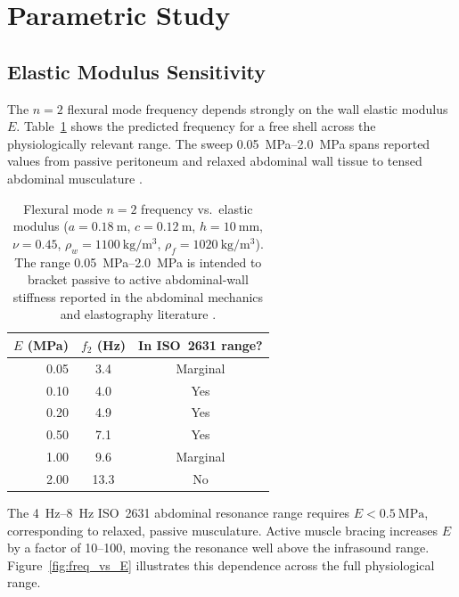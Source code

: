 \section{Parametric Study}\label{sec:results}

\subsection{Elastic Modulus Sensitivity}

The $n=2$ flexural mode frequency depends strongly on the wall elastic
modulus $E$.  Table~\ref{tab:E_sweep} shows the predicted frequency for
a free shell across the physiologically relevant range.  The sweep
\SIrange{0.05}{2.0}{\mega\pascal} spans reported values from passive
peritoneum and relaxed abdominal wall tissue to tensed abdominal musculature
\cite{Deeken2017,Spadoni2024,Sack2023,parker2011imaging}.

\begin{table}[htbp]
  \centering
  \caption{Flexural mode $n=2$ frequency vs.\ elastic modulus
  ($a = \SI{0.18}{\metre}$, $c = \SI{0.12}{\metre}$, $h = \SI{10}{\milli\metre}$,
  $\nu = 0.45$, $\rho_w = \SI{1100}{\kilogram\per\metre\cubed}$,
  $\rho_f = \SI{1020}{\kilogram\per\metre\cubed}$).  The range
  \SIrange{0.05}{2.0}{\mega\pascal} is intended to bracket passive to active
  abdominal-wall stiffness reported in the abdominal mechanics and elastography
  literature \cite{Deeken2017,Spadoni2024,Sack2023,parker2011imaging}.}
  \label{tab:E_sweep}
  \begin{tabular}{rcc}
    \hline
    $E$ (MPa) & $f_2$ (Hz) & In ISO~2631 range? \\
    \hline
    0.05 & 3.4 & Marginal \\
    0.10 & 4.0 & Yes \\
    0.20 & 4.9 & Yes \\
    0.50 & 7.1 & Yes \\
    1.00 & 9.6 & Marginal \\
    2.00 & 13.3 & No \\
    \hline
  \end{tabular}
\end{table}

The \SIrange{4}{8}{\hertz} ISO~2631 abdominal resonance range requires
$E < \SI{0.5}{\mega\pascal}$, corresponding to relaxed, passive musculature.
Active muscle bracing increases $E$ by a factor of 10--100, moving the
resonance well above the infrasound range.  Figure~\ref{fig:freq_vs_E}
illustrates this dependence across the full physiological range.

